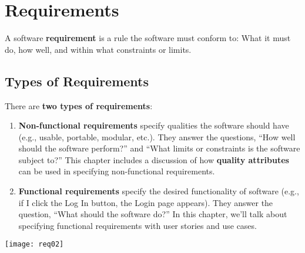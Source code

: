\yesmargins
\chapter{Requirements}
\marginpar{ \requirementDef\margindivider}\marginpar{\nonFunctionalRequirementDef\margindivider}\marginpar{\functionalRequirementDef}A software \textbf{requirement} is a rule the software must conform to: What it must do, how well, and within what constraints or limits.

\section{Types of Requirements}

There are \textbf{two types of requirements}:

\begin{enumerate}
\item \textbf{Non-functional requirements} specify qualities the software should have (e.g., usable, portable, modular, etc.). They answer the questions, ``How well should the software perform?'' and ``What limits or constraints is the software subject to?'' This chapter includes a discussion of how \textbf{quality attributes}\marginpar{\qualityAttributeDef} can be used in specifying non-functional requirements.
\item \textbf{Functional requirements} specify the desired functionality of software (e.g., if I click the Log In button, the Login page appears). They answer the question, ``What should the software do?'' In this chapter, we'll talk about specifying functional requirements with user stories and use cases.
\end{enumerate}

\begin{center}
\texttt{[image: req02]}
\end{center}

